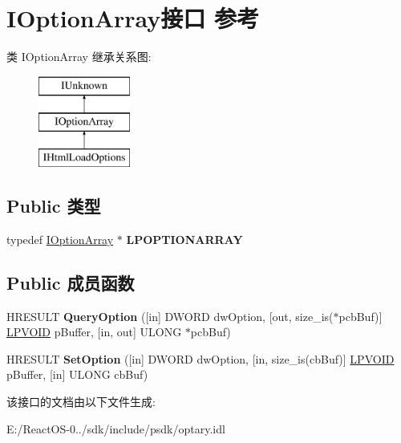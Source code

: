 \hypertarget{interface_i_option_array}{}\section{I\+Option\+Array接口 参考}
\label{interface_i_option_array}
类 I\+Option\+Array 继承关系图\+:\begin{figure}[H]
\begin{center}
\leavevmode
\includegraphics[height=3.000000cm]{interface_i_option_array}
\end{center}
\end{figure}
\subsection*{Public 类型}
\begin{DoxyCompactItemize}
\item 
\mbox{\label{interface_i_option_array_a08185a60b1b30f804b7597f1b3760126}} 
typedef \hyperlink{interface_i_option_array}{I\+Option\+Array} $\ast$ {\bfseries L\+P\+O\+P\+T\+I\+O\+N\+A\+R\+R\+AY}
\end{DoxyCompactItemize}
\subsection*{Public 成员函数}
\begin{DoxyCompactItemize}
\item 
\mbox{\label{interface_i_option_array_ae3dff0a0ae47cea41bb43bb87228c0c8}} 
H\+R\+E\+S\+U\+LT {\bfseries Query\+Option} (\mbox{[}in\mbox{]} D\+W\+O\+RD dw\+Option, \mbox{[}out, size\+\_\+is($\ast$pcb\+Buf)\mbox{]} \hyperlink{interfacevoid}{L\+P\+V\+O\+ID} p\+Buffer, \mbox{[}in, out\mbox{]} U\+L\+O\+NG $\ast$pcb\+Buf)
\item 
\mbox{\label{interface_i_option_array_aa74226baa3aa88f352222eb6f2d9eb96}} 
H\+R\+E\+S\+U\+LT {\bfseries Set\+Option} (\mbox{[}in\mbox{]} D\+W\+O\+RD dw\+Option, \mbox{[}in, size\+\_\+is(cb\+Buf)\mbox{]} \hyperlink{interfacevoid}{L\+P\+V\+O\+ID} p\+Buffer, \mbox{[}in\mbox{]} U\+L\+O\+NG cb\+Buf)
\end{DoxyCompactItemize}


该接口的文档由以下文件生成\+:\begin{DoxyCompactItemize}
\item 
E\+:/\+React\+O\+S-\/0../sdk/include/psdk/optary.\+idl\end{DoxyCompactItemize}
